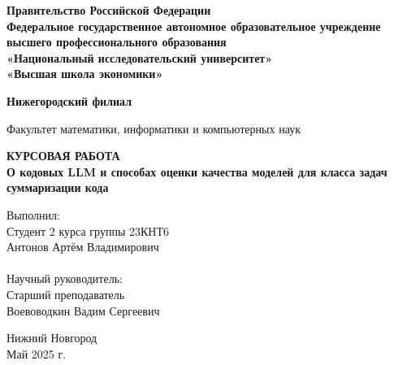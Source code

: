 \documentclass[14pt]{article}
\theoremstyle{definition}
\begin{document}
\begin{titlepage}
  \begin{center}
    \normalsize
   \textbf {Правительство Российской Федерации\\ 
Федеральное государственное автономное образовательное учреждение\\
   высшего профессионального образования\\
    «Национальный исследовательский университет» \\
     «Высшая школа экономики»}
   

    
    
    
    \textbf {Нижегородский филиал}
    
  \vfill
    Факультет математики, информатики и компьютерных наук\\
    
    
   
    \vfill

    \textbf{ КУРСОВАЯ РАБОТА}\\[5mm]
    
    {\normalsize  \textbf{О кодовых LLM и способах оценки качества моделей для класса задач
суммаризации кода}}
    
  \bigskip
    
    
\end{center}
\vfill

\newlength{\ML}
\hfill
\begin{minipage}{0.5\textwidth}
  Выполнил:\\
 Студент 2 курса группы 23КНТ6    
   \\
 Антонов Артём Владимирович\\ 


 \\Научный руководитель:\\
 Старший преподаватель\\ 
Воевоводкин Вадим Сергеевич\\
  \vspace{1cm}
 {\hspace{2.5cm}}
\end{minipage}%
\vfill

\begin{center}
  Нижний Новгород\\Май 2025 г.
\end{center}

\end{titlepage}
\end{document}
